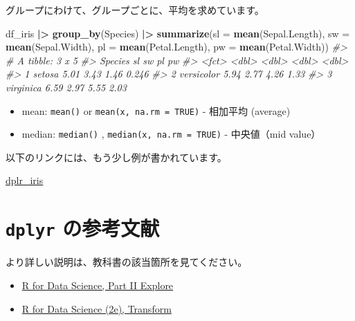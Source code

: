 \documentclass[
  xelatex, ja=standard]{bxjsbook}
\newenvironment{Shaded}{\begin{snugshade}}{\end{snugshade}}
\newcommand{\AttributeTok}[1]{\textcolor[rgb]{0.13,0.29,0.53}{#1}}
\newcommand{\CommentTok}[1]{\textcolor[rgb]{0.56,0.35,0.01}{\textit{#1}}}
\newcommand{\FunctionTok}[1]{\textcolor[rgb]{0.13,0.29,0.53}{\textbf{#1}}}
\newcommand{\NormalTok}[1]{#1}
\newcommand{\SpecialCharTok}[1]{\textcolor[rgb]{0.81,0.36,0.00}{\textbf{#1}}}
\providecommand{\tightlist}{%
  \setlength{\itemsep}{0pt}\setlength{\parskip}{0pt}}
\theoremstyle{definition}
\theoremstyle{definition}
\theoremstyle{definition}
\theoremstyle{definition}
\theoremstyle{remark}
\begin{document}
グループにわけて、グループごとに、平均を求めています。

\begin{Shaded}
\begin{Highlighting}[]
\NormalTok{df\_iris }\SpecialCharTok{|\textgreater{}} 
  \FunctionTok{group\_by}\NormalTok{(Species) }\SpecialCharTok{|\textgreater{}}
  \FunctionTok{summarize}\NormalTok{(}\AttributeTok{sl =} \FunctionTok{mean}\NormalTok{(Sepal.Length), }\AttributeTok{sw =} \FunctionTok{mean}\NormalTok{(Sepal.Width), }
  \AttributeTok{pl =} \FunctionTok{mean}\NormalTok{(Petal.Length), }\AttributeTok{pw =} \FunctionTok{mean}\NormalTok{(Petal.Width))}
\CommentTok{\#\textgreater{} \# A tibble: 3 x 5}
\CommentTok{\#\textgreater{}   Species       sl    sw    pl    pw}
\CommentTok{\#\textgreater{}   \textless{}fct\textgreater{}      \textless{}dbl\textgreater{} \textless{}dbl\textgreater{} \textless{}dbl\textgreater{} \textless{}dbl\textgreater{}}
\CommentTok{\#\textgreater{} 1 setosa      5.01  3.43  1.46 0.246}
\CommentTok{\#\textgreater{} 2 versicolor  5.94  2.77  4.26 1.33 }
\CommentTok{\#\textgreater{} 3 virginica   6.59  2.97  5.55 2.03}
\end{Highlighting}
\end{Shaded}

\begin{itemize}
\tightlist
\item
  mean: \texttt{mean()} or \texttt{mean(x,\ na.rm\ =\ TRUE)} - 相加平均 (average)
\item
  median: \texttt{median()} , \texttt{median(x,\ na.rm\ =\ TRUE)} - 中央値（mid value）
\end{itemize}

以下のリンクには、もう少し例が書かれています。

\href{https://icu-hsuzuki.github.io/da4r2022_note/dplyr-iris.nb.html}{dplr\_iris}

\hypertarget{dplyr-ux306eux53c2ux8003ux6587ux732e}{%
\section{\texorpdfstring{\texttt{dplyr} の参考文献}{dplyr の参考文献}}\label{dplyr-ux306eux53c2ux8003ux6587ux732e}}

より詳しい説明は、教科書の該当箇所を見てください。

\begin{itemize}
\tightlist
\item
  \href{https://r4ds.had.co.nz/wrangle-intro.html\#wrangle-intro}{R for Data Science, Part II Explore}
\item
  \href{https://r4ds.hadley.nz/transform}{R for Data Science (2e), Transform}
\end{itemize}
\end{document}
